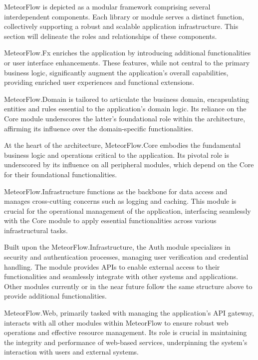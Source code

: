 MeteorFlow is depicted as a modular framework comprising several interdependent
components. Each library or module serves a distinct function, collectively
supporting a robust and scalable application infrastructure. This section will
delineate the roles and relationships of these components.

MeteorFlow.Fx enriches the application by introducing additional functionalities
or user interface enhancements. These features, while not central to the primary
business logic, significantly augment the application’s overall capabilities,
providing enriched user experiences and functional extensions.

MeteorFlow.Domain is tailored to articulate the business domain, encapsulating
entities and rules essential to the application's domain logic. Its reliance on
the Core module underscores the latter’s foundational role within the
architecture, affirming its influence over the domain-specific functionalities.

At the heart of the architecture, MeteorFlow.Core embodies the fundamental
business logic and operations critical to the application. Its pivotal role is
underscored by its influence on all peripheral modules, which depend on the Core
for their foundational functionalities.

MeteorFlow.Infrastructure functions as the backbone for data access and manages
cross-cutting concerns such as logging and caching. This module is crucial for
the operational management of the application, interfacing seamlessly with the
Core module to apply essential functionalities across various infrastructural
tasks.

Built upon the MeteorFlow.Infrastructure, the Auth module specializes in
security and authentication processes, managing user verification and credential
handling. The module provides APIs to enable external access to their functionalities and
seamlessly integrate with other systems and applications. Other modules
currently or in the near future follow the same structure above to provide
additional functionalities.

MeteorFlow.Web, primarily tasked with managing the application’s API gateway,
interacts with all other modules within MeteorFlow to ensure robust web
operations and effective resource management. Its role is crucial in maintaining
the integrity and performance of web-based services, underpinning the system's
interaction with users and external systems.


